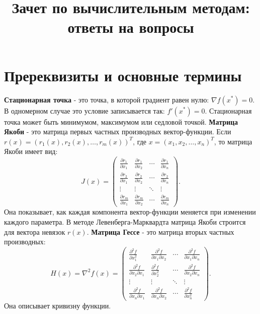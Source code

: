 \documentclass[12pt,a4paper]{article}
\title{Зачет по вычислительным методам: ответы на вопросы}
\author{}
\date{}
\begin{document}
\maketitle
\tableofcontents
\newpage

\section{Пререквизиты и основные термины}
\textbf{Стационарная точка} - это точка, в которой градиент равен нулю: $\nabla f(x^*)=0.$
В одномерном случае это условие записывается так: $f'(x^*)=0.$
Стационарная точка может быть минимумом, максимумом или седловой точкой.
\textbf{Матрица Якоби} - это матрица первых частных производных вектор-функции. Если $r(x)=(r_1(x),r_2(x),\ldots,r_m(x))^T$, где $x=(x_1,x_2,\ldots,x_n)^T$, то матрица Якоби имеет вид:
\[
J(x)=
\begin{pmatrix}
\frac{\partial r_1}{\partial x_1} &
\frac{\partial r_1}{\partial x_2} &
\cdots &
\frac{\partial r_1}{\partial x_n}\\
\frac{\partial r_2}{\partial x_1} &
\frac{\partial r_2}{\partial x_2} &
\cdots &
\frac{\partial r_2}{\partial x_n}\\
\vdots & \vdots & \ddots & \vdots\\
\frac{\partial r_m}{\partial x_1} &
\frac{\partial r_m}{\partial x_2} &
\cdots &
\frac{\partial r_m}{\partial x_n}
\end{pmatrix}.
\]
Она показывает, как каждая компонента вектор-функции меняется при изменении каждого параметра. В методе Левенберга-Марквардта матрица Якоби строится для вектора невязок $r(x)$.
\textbf{Матрица Гессе} - это матрица вторых частных производных:
\[
H(x)=\nabla^2 f(x)=
\begin{pmatrix}
\frac{\partial^2 f}{\partial x_1^2} &
\frac{\partial^2 f}{\partial x_1\partial x_2} &
\cdots &
\frac{\partial^2 f}{\partial x_1\partial x_n}\\
\frac{\partial^2 f}{\partial x_2\partial x_1} &
\frac{\partial^2 f}{\partial x_2^2} &
\cdots &
\frac{\partial^2 f}{\partial x_2\partial x_n}\\
\vdots & \vdots & \ddots & \vdots\\
\frac{\partial^2 f}{\partial x_n\partial x_1} &
\frac{\partial^2 f}{\partial x_n\partial x_2} &
\cdots &
\frac{\partial^2 f}{\partial x_n^2}
\end{pmatrix}.
\]
Она описывает кривизну функции.
\end{document}
